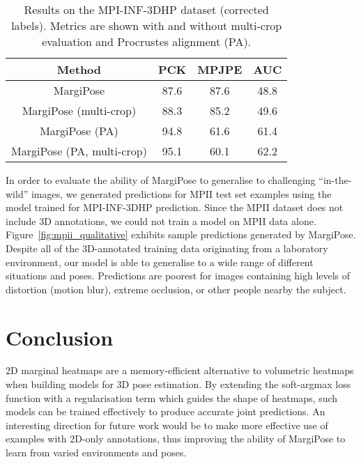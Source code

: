 \documentclass[australian,10pt,twocolumn,letterpaper,twocolumn]{article}
\makeatletter
\providecommand{\tabularnewline}{\\}
\newcommand{\ourmodel}{MargiPose}
\renewcommand{\paragraph}{\@startsection{paragraph}{4}{\z@}{0.7ex \@plus 0.2ex \@minus 0.2ex}{-1em}{\normalfont\normalsize\bfseries}}
\makeatother
\begin{document}
\begin{table}
\begin{centering}
\begin{tabular}{cccc}
\hline 
Method & PCK & MPJPE & AUC\tabularnewline
\hline 
\ourmodel{} & 87.6 & 87.6 & 48.8\tabularnewline
\ourmodel{} (multi-crop) & 88.3 & 85.2 & 49.6\tabularnewline
\hline 
\ourmodel{} (PA) & 94.8 & 61.6 & 61.4\tabularnewline
\ourmodel{} (PA, multi-crop) & 95.1 & 60.1 & 62.2\tabularnewline
\hline 
\end{tabular}
\par\end{centering}
\caption{\label{tbl:mpi3d-corrected}Results on the MPI-INF-3DHP dataset (corrected
labels). Metrics are shown with and without multi-crop evaluation
and Procrustes alignment (PA).}
\end{table}

\paragraph{Qualitative results.}

In order to evaluate the ability of \ourmodel{} to generalise to
challenging ``in-the-wild'' images, we generated predictions for
MPII test set examples using the model trained for MPI-INF-3DHP prediction.
Since the MPII dataset does not include 3D annotations, we could not
train a model on MPII data alone. Figure~\ref{fig:mpii_qualitative}
exhibits sample predictions generated by \ourmodel{}. Despite all
of the 3D-annotated training data originating from a laboratory environment,
our model is able to generalise to a wide range of different situations
and poses. Predictions are poorest for images containing high levels
of distortion (\eg motion blur), extreme occlusion, or other people
nearby the subject.

\section{Conclusion}

2D marginal heatmaps are a memory-efficient alternative to volumetric
heatmaps when building models for 3D pose estimation. By extending
the soft-argmax loss function with a regularisation term which guides
the shape of heatmaps, such models can be trained effectively to produce
accurate joint predictions. An interesting direction for future work
would be to make more effective use of examples with 2D-only annotations,
thus improving the ability of \ourmodel{} to learn from varied environments
and poses.



\end{document}
